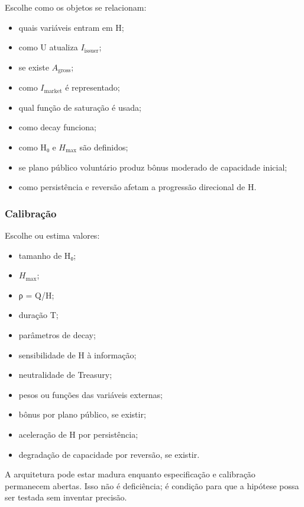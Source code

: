 \documentclass[
  a4paper,
]{article}
\providecommand{\tightlist}{%
  \setlength{\itemsep}{0pt}\setlength{\parskip}{0pt}}
\begin{document}
Escolhe como os objetos se relacionam:

\begin{itemize}
\tightlist
\item
  quais variáveis entram em H;
\item
  como U atualiza \(I_{\mathrm{issuer}}\);
\item
  se existe \(A_{\mathrm{gross}}\);
\item
  como \(I_{\mathrm{market}}\) é representado;
\item
  qual função de saturação é usada;
\item
  como decay funciona;
\item
  como H₀ e \(H_{\max}\) são definidos;
\item
  se plano público voluntário produz bônus moderado de capacidade
  inicial;
\item
  como persistência e reversão afetam a progressão direcional de H.
\end{itemize}

\hypertarget{calibrauxe7uxe3o}{%
\subsubsection{Calibração}\label{calibrauxe7uxe3o}}

Escolhe ou estima valores:

\begin{itemize}
\tightlist
\item
  tamanho de H₀;
\item
  \(H_{\max}\);
\item
  ρ = Q/H;
\item
  duração T;
\item
  parâmetros de decay;
\item
  sensibilidade de H à informação;
\item
  neutralidade de Treasury;
\item
  pesos ou funções das variáveis externas;
\item
  bônus por plano público, se existir;
\item
  aceleração de H por persistência;
\item
  degradação de capacidade por reversão, se existir.
\end{itemize}

A arquitetura pode estar madura enquanto especificação e calibração
permanecem abertas. Isso não é deficiência; é condição para que a
hipótese possa ser testada sem inventar precisão.
\end{document}
